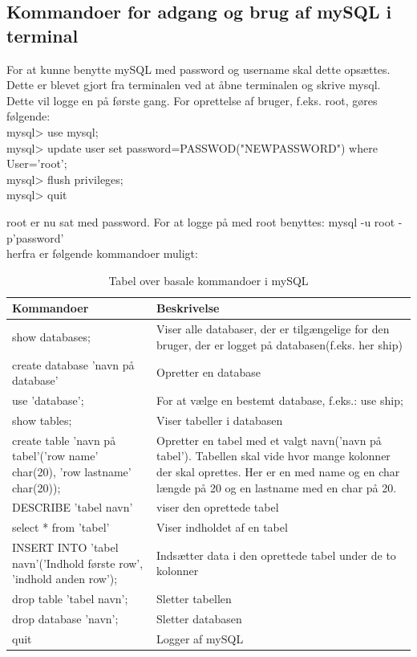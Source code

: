 \subsection*{Kommandoer for adgang og brug af mySQL i terminal}
For at kunne benytte mySQL med password og username skal dette opsættes. Dette er blevet gjort fra terminalen ved at åbne terminalen og skrive mysql. Dette vil logge en på første gang. For oprettelse af bruger, f.eks. root, gøres følgende:\\
mysql> use mysql;\\
mysql> update user set password=PASSWOD("NEWPASSWORD") where User='root';\\
mysql> flush privileges;\\
mysql> quit

root er nu sat med password. For at logge på med root benyttes:
mysql -u root -p'password'\\
herfra er følgende kommandoer muligt:
\begin{table}[H]
\begin{tabular}{|p{5cm}|p{10cm}|} \hline
\cellcolor[gray]{0.85}Kommandoer& \cellcolor[gray]{0.85}Beskrivelse  \\ \hline
show databases; & Viser alle databaser, der er tilgængelige for den bruger, der er logget på databasen(f.eks. her ship)   \\ \hline
create database 'navn på database' & Opretter en database   \\ \hline
use 'database'; & For at vælge en bestemt database, f.eks.: use ship;    \\ \hline
show tables; & Viser tabeller i databasen   \\ \hline
create table 'navn på tabel'('row name' char(20), 'row lastname' char(20));  & Opretter en tabel med et valgt navn('navn på tabel'). Tabellen skal vide hvor mange kolonner der skal oprettes. Her er en med name og en char længde på 20 og en lastname med en char på 20.  \\ \hline
DESCRIBE 'tabel navn' & viser den oprettede tabel   \\ \hline
select * from 'tabel' & Viser indholdet af en tabel   \\ \hline
INSERT INTO 'tabel navn'('Indhold første row', 'indhold anden row');  & Indsætter data i den oprettede tabel under de to kolonner   \\ \hline
drop table 'tabel navn'; & Sletter tabellen\\ \hline
drop database 'navn'; & Sletter databasen\\ \hline
quit & Logger af mySQL\\ \hline
\end{tabular}
\caption{Tabel over basale kommandoer i mySQL}
\label{table:mysqlKommandoer}
\end{table}

